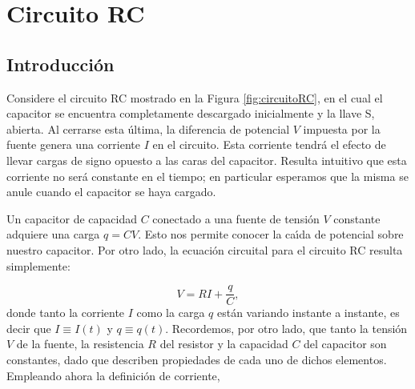 \documentclass[laboratorio]{guia}
\begin{document}
 
\maketitle

\section{Circuito RC}

\subsection{Introducci\'on}

Considere el circuito RC mostrado en la Figura \ref{fig:circuitoRC}, en el
cual el capacitor se encuentra completamente descargado inicialmente y la
llave S, abierta. Al cerrarse esta \'ultima, la diferencia de potencial
$V$ impuesta por la fuente genera una corriente $I$ en el circuito. Esta 
corriente tendr\'a el efecto de llevar cargas de signo opuesto a las caras 
del capacitor. Resulta intuitivo que esta corriente no ser\'a constante en el tiempo; 
en particular esperamos que la misma se anule cuando el capacitor se haya
cargado. 


Un capacitor de capacidad $C$ conectado a una fuente de tensi\'on $V$ constante 
adquiere una carga $q = C V$. Esto nos permite conocer la ca\'\i da de
potencial sobre nuestro capacitor. Por otro lado, la ecuaci\'on circuital para
el circuito RC resulta simplemente:

\begin{equation}
    V = RI + \frac{q}{C},
\end{equation}
donde tanto la corriente $I$ como la carga $q$ est\'an variando instante a
instante, es decir que $I \equiv I(t)$ y $q \equiv q(t)$. Recordemos, por otro
lado, que tanto la tensi\'on $V$ de la fuente, la resistencia $R$ del resistor
y la capacidad $C$ del capacitor son constantes, dado que describen propiedades de
cada uno de dichos elementos. Empleando ahora la definici\'on de corriente,
\end{document}
